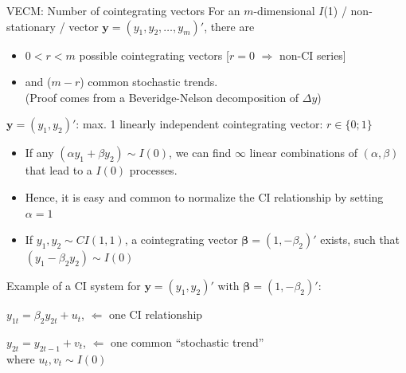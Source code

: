 \documentclass[usenames,dvipsnames]{beamer}
\begin{document}
\begin{frame}{VECM: Number of cointegrating vectors}
\footnotesize
For an $m$-dimensional $I$(1) / non-stationary / vector $\bm{y}=(y_1, y_2, \dots, y_m)'$, there are
\begin{itemize}
\item $0 < r < m$ possible cointegrating vectors [$r=0$ $\Rightarrow$ non-CI series]
\item and ($m-r$) common stochastic trends.\\
(Proof comes from a Beveridge-Nelson decomposition of $\Delta y$)
\end{itemize}
$\bm{y} = (y_1, y_2)'$: max. 1 linearly independent cointegrating vector: $r \in \{0;1\}$
\begin{itemize}
\item If any $(\alpha y_1 + \beta y_2) \sim I(0)$, we can find $\infty$ linear combinations of $(\alpha, \beta)$ that lead to a $I(0)$ processes.
\item Hence, it is easy and common to normalize the CI relationship by setting $\alpha=1$
\item If $y_1, y_2 \sim CI(1,1)$, a cointegrating vector $\bm{\beta} = (1, -\beta_2)'$ exists, such that $(y_1 - \beta_2 y_2) \sim I(0)$
\end{itemize}
Example of a CI system for $\bm{y} = (y_1, y_2)'$ with $\bm{\beta} = (1, -\beta_2)'$:
\begin{enumerate}[ {[}1{]} ]
\item $y_{1t} = \beta_2 y_{2t} + u_t$, \qquad $\Leftarrow$ one CI relationship
\item $y_{2t} = y_{2t-1} + v_t$, \qquad $\Leftarrow$ one common ``stochastic trend''\\
where $u_t, v_t \sim I(0)$
\end{enumerate}
\end{frame}
\end{document}
